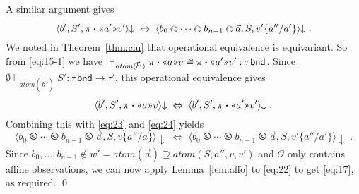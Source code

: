\documentclass{LMCS}
\theoremstyle{plain}
\theoremstyle{definition}
\newcommand{\act}{\mathbin{\mbox{\boldmath$\cdot$}}}
\newcommand{\atm}[1][a]{#1}
\newcommand{\atoms}{\mathit{atom}}
\newcommand{\bimp}{\Leftrightarrow}
\newcommand{\BINDTY}{\kw{bnd}}
\newcommand{\BINDVAL}[2]{\mathopen{\text{\normalfont\guillemotleft}}#1
  \mathclose{\text{\normalfont\guillemotright}}#2}
\newcommand{\config}[3]{\langle#1, #2, #3\rangle}
\newcommand{\ent}{\vdash}
\newcommand{\FUNTY}{\mathbin{\rightarrow}}
\newcommand{\LP}{\mathopen{\kw{(}}}
\newcommand{\kw}[1]{\mathsf{#1}}
\newcommand{\Obs}{\mathcal{O}}
\newcommand{\ofty}{:}
\newcommand{\opeq}{\cong}
\newcommand{\ords}{\olessthan}\newcommand{\PAIR}[2]{\LP#1\mathbin{\kw{,}}#2\RP}
\newcommand{\rename}[2]{\{#2/#1\}}
\newcommand{\RP}{\mathclose{\kw{)}}}
\newcommand{\s}[1][a]{\vec{#1}}
\newcommand{\stk}[1][S]{#1}
\newcommand{\terminates}[1][]{{\downarrow_{#1}}}
\newcommand{\ty}{\tau}
\newcommand{\val}[1][v]{#1}
\newcommand{\w}[1][w]{#1}
\begin{document}
  A similar argument gives
  \begin{equation}
    \label{eq:24}
    \config{\s[b]'}{\stk'}{\pi\act\BINDVAL{\atm'}{\val'}}\terminates
    \;\bimp\;
    \config{\atm[b]_0\ords\cdots\ords\atm[b]_{n-1}\ords\s}{\stk}{\val'\rename{\atm'}{\atm''}}\terminates\;.  
  \end{equation}
  We noted in Theorem~\ref{thm:ciu} that operational
  equivalence is equivariant. So from \eqref{eq:15-1} we have
  ${}\ent_{\atoms(\s[b]')}\pi\act\BINDVAL{\atm}{\val} \opeq
  \pi\act\BINDVAL{\atm'}{\val'} \ofty \ty\BINDTY$. Since
  $\emptyset\ent_{\atoms(\s[b]')} \stk'\ofty\ty\,\BINDTY\FUNTY\ty'$,
  this operational equivalence gives
  \[
  \config{\s[b]'}{\stk'}{\pi\act\BINDVAL{\atm}{\val}}\terminates
  \;\bimp\;
  \config{\s[b]'}{\stk'}{\pi\act\BINDVAL{\atm'}{\val'}}\terminates\;.
  \]
  Combining this with \eqref{eq:23} and \eqref{eq:24} yields
  \begin{equation}
    \label{eq:22}
    \config{\atm[b]_0\ords\cdots\ords\atm[b]_{n-1}\ords\s}{\stk}{\val\rename{\atm}{\atm''}}\terminates
    \;\bimp\;
    \config{\atm[b]_0\ords\cdots\ords\atm[b]_{n-1}\ords\s}{\stk}{\val'\rename{\atm'}{\atm''}}\terminates\;.
  \end{equation}
  Since $\atm[b]_0,\ldots,\atm[b]_{n-1}\notin \w' =
  \atoms(\s)\supseteq\atoms(\stk,\atm'',\val,\val')$ and $\Obs$ only
  contains affine observations, we can now apply Lemma~\ref{lem:affo}
  to \eqref{eq:22} to get \eqref{eq:17}, as required.
\qed
\end{document}
